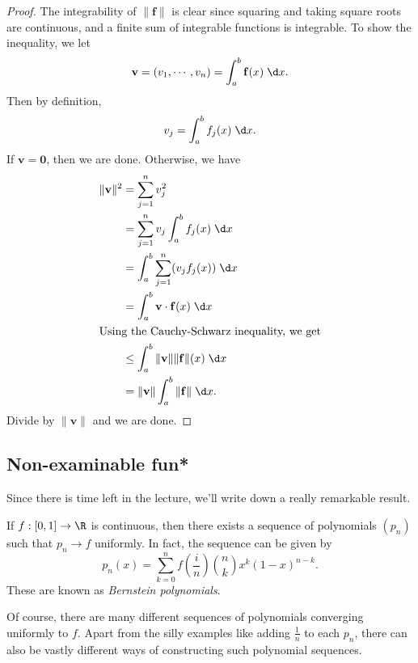 \documentclass[a4paper]{article}
\begin{document}
\begin{proof}
  The integrability of $\|\mathbf{f}\|$ is clear since squaring and taking square roots are continuous, and a finite sum of integrable functions is integrable. To show the inequality, we let
  \[
    \mathbf{v} = (v_1, \cdots, v_n) = \int_a^b \mathbf{f}(x)\;\d x.
  \]
  Then by definition,
  \[
    v_j = \int_a^b f_j(x)\;\d x.
  \]
  If $\mathbf{v} = \mathbf{0}$, then we are done. Otherwise, we have
  \begin{align*}
    \|\mathbf{v}\|^2 &= \sum_{j = 1}^n v_j^2 \\
    &= \sum_{j = 1}^n v_j \int_a^b f_j(x)\;\d x \\
    &= \int_a^b \sum_{j = 1}^n (v_j f_j(x))\;\d x\\
    &= \int_a^b \mathbf{v}\cdot \mathbf{f}(x)\;\d x\\
    \intertext{Using the Cauchy-Schwarz inequality, we get}
    &\leq \int_a^b \|\mathbf{v}\| \|\mathbf{f}\|(x)\;\d x\\
    &= \|\mathbf{v}\|\int_a^b \|\mathbf{f}\|\;\d x.
  \end{align*}
  Divide by $\|\mathbf{v}\|$ and we are done.
\end{proof}
\subsection{Non-examinable fun*}
Since there is time left in the lecture, we'll write down a really remarkable result.
\begin{thm}
  If $f: [0, 1] \to \R$ is continuous, then there exists a sequence of polynomials $(p_n)$ such that $p_n \to f$ uniformly. In fact, the sequence can be given by
  \[
    p_n(x) = \sum_{k = 0}^n f\left(\frac{i}{n}\right) \binom{n}{k} x^k(1 - x)^{n - k}.
  \]
  These are known as \emph{Bernstein polynomials}.
\end{thm}
Of course, there are many different sequences of polynomials converging uniformly to $f$. Apart from the silly examples like adding $\frac{1}{n}$ to each $p_n$, there can also be vastly different ways of constructing such polynomial sequences.
\end{document}
